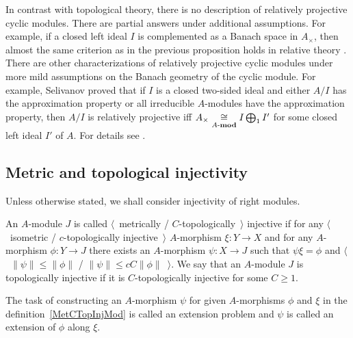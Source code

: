 In contrast with topological theory, there is no description of relatively
projective cyclic modules. There are partial answers under additional
assumptions. For example, if a closed left ideal $I$ is complemented as a Banach space in
$A_\times$, then almost the same criterion as in the previous proposition holds in
relative theory \cite[proposition 7.1.29]{HelBanLocConvAlg}. There are other
characterizations of relatively projective cyclic modules under more mild
assumptions on the Banach geometry of the cyclic module. For example, Selivanov 
proved that if $I$ is a closed two-sided ideal and either $A/I$ has 
the approximation property or all irreducible $A$-modules have the approximation 
property, then $A/I$ is relatively projective 
iff $A_\times\mathrel{\mathop{\cong}\limits_{A\text{-}\mathbf{mod}}}I\bigoplus_1 I'$ for some closed left 
ideal $I'$ of $A$. For details see \cite[chapter IV, \S 4]{HelHomolBanTopAlg}.


\subsection{
    Metric and topological injectivity}\label{SubSectionMetricAndTopologicalInjectivity}

Unless otherwise stated, we shall consider injectivity of right modules.

\begin{definition}\label{MetCTopInjMod} 
An $A$-module $J$ is 
called $\langle$~metrically / $C$-topologically~$\rangle$ injective if for any 
$\langle$~isometric / $c$-topologically injective~$\rangle$
$A$-morphism $\xi:Y\to X$ and for any $A$-morphism $\phi:Y\to J$ 
there exists an $A$-morphism $\psi:X\to J$ such that $\psi\xi=\phi$  and
$\langle$~$\lVert\psi\rVert\leq\lVert\phi\rVert$ / 
$\lVert \psi\rVert\leq c C\lVert\phi\rVert$~$\rangle$. We say that an $A$-module 
$J$ is topologically injective if it is $C$-topologically injective for 
some $C\geq 1$.
\end{definition}

The task of constructing an $A$-morphism $\psi$ for given $A$-morphisms $\phi$ 
and $\xi$ in the definition~\ref{MetCTopInjMod} is called an extension problem 
and $\psi$ is called an extension of $\phi$ along $\xi$.

